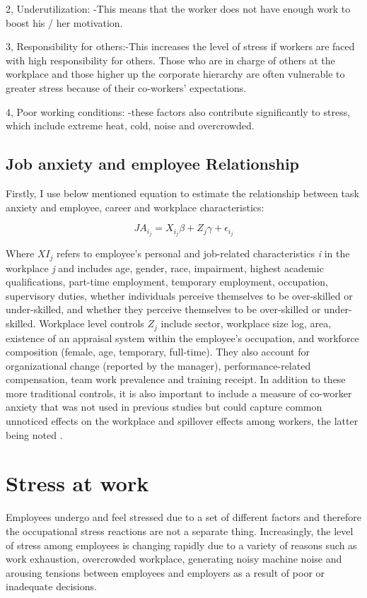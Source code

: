 2, Underutilization: -This means that the worker does not have enough work to boost his / her motivation.

3, Responsibility for others:-This increases the level of stress if workers are faced with high responsibility for others.  Those who are in charge of others at the workplace and those higher up the corporate hierarchy are often vulnerable to greater stress because of their co-workers' expectations.

4, Poor working conditions: -these factors also contribute significantly to stress, which include extreme heat, cold, noise and overcrowded. \citep[p.318-319]{Bloisi2007ManagementBehaviour}

\subsection{Job anxiety and employee Relationship}

Firstly, I use below mentioned equation to estimate the relationship between task anxiety and employee, career and workplace characteristics:\citep{Cottini2013MentalEurope}

\[JA_{i_j} = X_{i_j} \beta+Z_j \gamma+\epsilon_{i_j}\] 

Where \(X { I_j}\) refers to employee's personal and job-related characteristics \textit{i } in the workplace \textit{j } and includes age, gender, race, impairment, highest academic qualifications, part-time employment, temporary employment, occupation, supervisory duties, whether individuals perceive themselves to be over-skilled or under-skilled, and whether they perceive themselves to be over-skilled or under-skilled. Workplace level controls \(Z_j\) include sector, workplace size log, area, existence of an appraisal system within the employee's occupation, and workforce composition (female, age, temporary, full-time). They also account for organizational change (reported by the manager), performance-related compensation, team work prevalence and training receipt.  In addition to these more traditional controls, it is also important to include a measure of co-worker anxiety that was not used in previous studies but could capture common unnoticed effects on the workplace and spillover effects among workers, the latter being noted \citep{Cottini2013MentalEurope}.

\section{Stress at work}
Employees undergo and feel stressed due to a set of different factors and therefore the occupational stress reactions are not a separate thing. \citep[p.8]{Fairbrother2003WorkplaceSatisfaction} Increasingly, the level of stress among employees is changing rapidly due to a variety of reasons such as work exhaustion, overcrowded workplace, generating noisy machine noise and arousing tensions between employees and employers as a result of poor or inadequate decisions.

